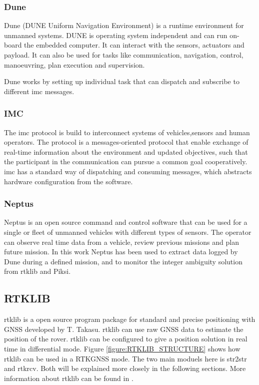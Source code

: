 \subsubsection{Dune}
Dune (DUNE Uniform Navigation Environment) is a runtime environment for unmanned systems. DUNE is operating system independent and can run on-board the embedded computer. It can interact with the sensors, actuators and payload. It can also be used for tasks like communication, navigation, control, manoeuvring, plan execution and supervision.

Dune works by setting up individual task that can dispatch and subscribe to different \gls{imc} messages.
\subsubsection{IMC}\label{ss:IMC}
The \acrfull{imc} protocol is build to interconnect systems of vehicles,sensors and human operators. The protocol is a messages-oriented protocol that enable exchange of real-time information about the environment and updated objectives, such that the participant in the communication can pursue a common goal cooperatively.
\gls{imc} has a standard way of dispatching and consuming messages, which abstracts hardware configuration from the software.

\subsubsection{Neptus}
Neptus is an open source command and control software that can be used for a single or fleet of unmanned vehicles with different types of sensors. The operator can observe real time data from a vehicle, review previous missions and plan future mission. In this work Neptus has been used to extract data logged by Dune during a defined mission, and to monitor the integer ambiguity solution from \gls{rtklib} and Piksi.
\subsection{RTKLIB}\label{ss:Rtklib}
\acrfull{rtklib} is a open source program package for standard and precise positioning with GNSS developed by T. Takasu. \gls{rtklib} can use raw GNSS data to estimate the position of the rover. \gls{rtklib} can be configured to give a position solution in real time in differential mode. Figure \ref{figure:RTKLIB_STRUCTURE} shows how \gls{rtklib} can be used in a RTKGNSS mode. The two main moduels here is str2str and rtkrcv. Both will be explained more closely in the following sections. More information about  \gls{rtklib} can be found in \citep{Rtklib242}.

